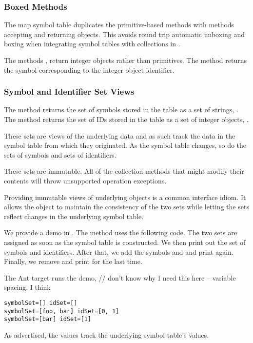 \subsubsection{Boxed Methods}

The map symbol table duplicates the primitive-based 
methods with methods accepting and returning  objects.
This avoids round trip automatic unboxing and boxing when integrating
symbol tables with collections in .  

The methods ,
 return integer objects rather than
primitives.  The method  returns the symbol
corresponding to the integer object identifier.


\subsubsection{Symbol and Identifier Set Views}

The method  returns the set of symbols stored in the
table as a set of strings, .  The method
 returns the set of IDs stored in the table as a set of
integer objects, .  

These sets are views of the underlying data and as such track the data
in the symbol table from which they originated.  As the symbol table
changes, so do the sets of symbols and sets of identifiers.  

These sets are immutable.  All of the collection methods that might
modify their contents will throw unsupported operation exceptions.

Providing immutable views of underlying objects is a common interface
idiom.  It allows the object to maintain the consistency of the two
sets while letting the sets reflect changes in the underlying symbol
table.

We provide a demo in .  The  method
uses the following code.
%
%
The two sets are assigned as soon as the symbol table is constructed.
We then print out the set of symbols and identifiers.  After that, we
add the symbols  and  and print again.  
Finally, we remove  and print for the last time.

The Ant target  runs the demo,
%
\vspace*{6pt} // don't know why I need this here -- variable spacing, I think
\begin{verbatim}
symbolSet=[] idSet=[]
symbolSet=[foo, bar] idSet=[0, 1]
symbolSet=[bar] idSet=[1]
\end{verbatim}
%
As advertised, the values track the underlying symbol table's values.


